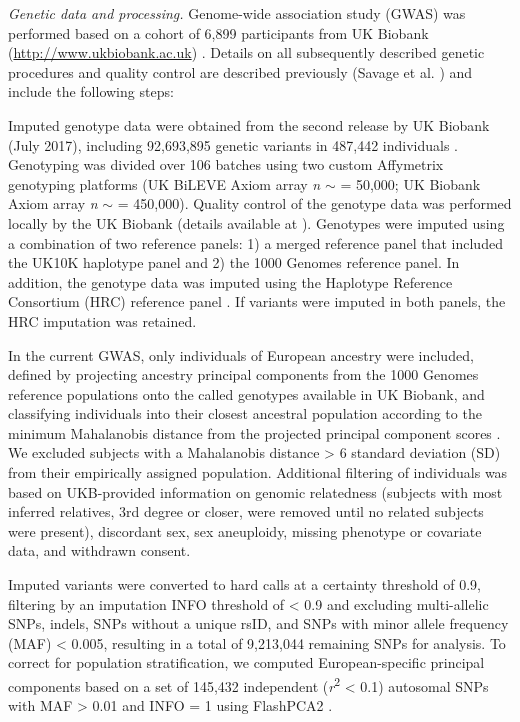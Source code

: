 \begin{refsection}
\noindent
\textit{Genetic data and processing.} Genome-wide association study (GWAS) was performed based on a cohort of 6,899 participants from UK Biobank (\url{http://www.ukbiobank.ac.uk}) \citep{sudlow2015uk}. Details on all subsequently described genetic procedures and quality control are described previously (Savage et al. \citep{Savage2018GenomewideAM}) and include the following steps:

Imputed genotype data were obtained from the second release by UK Biobank (July 2017), including 92,693,895 genetic variants in 487,442 individuals \citep{Bycroft2018TheUB}. Genotyping was divided over 106 batches using two custom Affymetrix genotyping platforms (UK BiLEVE Axiom array \textit{n} $ \mathsf{\sim} $ = 50,000; UK Biobank Axiom array \textit{n} $ \mathsf{\sim} $ = 450,000). Quality control of the genotype data was performed locally by the UK Biobank (details available at \citep{sudlow2015uk}). Genotypes were imputed using a combination of two reference panels: 1) a merged reference panel that included the UK10K haplotype panel and 2) the 1000 Genomes reference panel. In addition, the genotype data was imputed using the Haplotype Reference Consortium (HRC) reference panel \citep{McCarthy2016ARP}. If variants were imputed in both panels, the HRC imputation was retained.

In the current GWAS, only individuals of European ancestry were included, defined by projecting ancestry principal components from the 1000 Genomes reference populations \citep{Auton2015AGR} onto the called genotypes available in UK Biobank, and classifying individuals into their closest ancestral population according to the minimum Mahalanobis distance from the projected principal component scores \citep{Webb2017MolecularGI}. We excluded subjects with a Mahalanobis distance > 6 standard deviation (SD) from their empirically assigned population. Additional filtering of individuals was based on UKB-provided information on genomic relatedness (subjects with most inferred relatives, 3rd degree or closer, were removed until no related subjects were present), discordant sex, sex aneuploidy, missing phenotype or covariate data, and withdrawn consent.

Imputed variants were converted to hard calls at a certainty threshold of 0.9, filtering by an imputation INFO threshold of < 0.9 and excluding multi-allelic SNPs, indels, SNPs without a unique rsID, and SNPs with minor allele frequency (MAF) < 0.005, resulting in a total of 9,213,044 remaining SNPs for analysis. To correct for population stratification, we computed European-specific principal components based on a set of 145,432 independent (\textit{r}\textsuperscript{2 }< 0.1) autosomal SNPs with MAF > 0.01 and INFO = 1 using FlashPCA2 \citep{Abraham2016FlashPCA2PC}.


\end{refsection}
